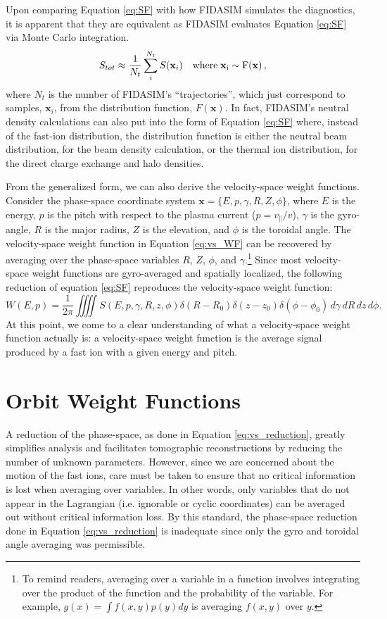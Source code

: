 Upon comparing Equation \ref{eq:SF} with how FIDASIM simulates the diagnostics, it is apparent that they are equivalent as FIDASIM evaluates Equation \ref{eq:SF} via Monte Carlo integration.
\begin{equation}
    S_{tot} \approx \frac{1}{N_t} \sum_i^{N_t} S(\mathbf{x}_i)\quad \rm{where}\; \mathbf{x}_i \sim F(\mathbf{x})\,,
\end{equation}
where $N_t$ is the number of FIDASIM's ``trajectories'', which just correspond to samples, $\mathbf{x}_i$, from the distribution function, $F(\mathbf{x})$. In fact, FIDASIM's neutral density calculations can also put into the form of Equation \ref{eq:SF} where, instead of the fast-ion distribution, the distribution function is either the neutral beam distribution, for the beam density calculation, or the thermal ion distribution, for the direct charge exchange and halo densities.

From the generalized form, we can also derive the velocity-space weight functions.
Consider the phase-space coordinate system $\mathbf{x} = \{E,p,\gamma, R, Z, \phi\}$, where $E$ is the energy, $p$ is the pitch with respect to the plasma current ($p=v_{\parallel}/v$), $\gamma$ is the gyro-angle, $R$ is the major radius, $Z$ is the elevation, and $\phi$ is the toroidal angle. The velocity-space weight function in Equation \ref{eq:vs_WF} can be recovered by averaging over the phase-space variables $R$, $Z$, $\phi$, and $\gamma$.\footnote{To remind readers, averaging over a variable in a function involves integrating over the product of the function and the probability of the variable. For example, $g(x) = \int f(x,y)p(y)dy$ is averaging $f(x,y)$ over $y$.}
Since most velocity-space weight functions are gyro-averaged and spatially localized, the following reduction of equation \ref{eq:SF} reproduces the velocity-space weight function:
\begin{equation}\label{eq:vs_reduction}
    W(E,p) = \frac{1}{2\pi} \iiiint S(E,p,\gamma,R,z,\phi)\delta(R-R_0)\delta(z-z_0)\delta(\phi - \phi_0)\,d\gamma\, dR\, dz\, d\phi.
\end{equation}
At this point, we come to a clear understanding of what a velocity-space weight function actually is: a velocity-space weight function is the average signal produced by a fast ion with a given energy and pitch. 

\section{Orbit Weight Functions}\label{sec:orbit_weight}
A reduction of the phase-space, as done in Equation \ref{eq:vs_reduction}, greatly simplifies analysis and facilitates tomographic reconstructions by reducing the number of unknown parameters.
However, since we are concerned about the motion of the fast ions, care must be taken to ensure that no critical information is lost when averaging over variables.
In other words, only variables that do not appear in the Lagrangian (i.e. ignorable or cyclic coordinates) can be averaged out without critical information loss.
By this standard, the phase-space reduction done in Equation \ref{eq:vs_reduction} is inadequate since only the gyro and toroidal angle averaging was permissible. 

